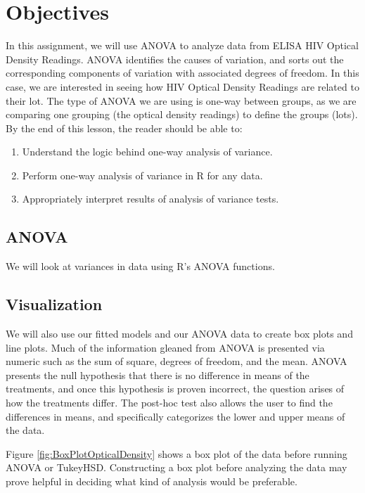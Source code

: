 \section{Objectives}

In this assignment, we will use ANOVA to analyze data from ELISA HIV Optical Density Readings.
ANOVA identifies the causes of variation, and sorts out the corresponding components of variation with associated degrees of freedom. 
In this case, we are interested in seeing how HIV Optical Density Readings are related to their lot. 
The type of ANOVA we are using is one-way between groups, as we are comparing one grouping (the optical density readings) to define the groups (lots). 
\singlespacing
By the end of this lesson, the reader should be able to:
\begin{enumerate}
        \item Understand the logic behind one-way analysis of variance.
        \item Perform one-way analysis of variance in R for any data. 
        \item Appropriately interpret results of analysis of variance tests.
\end{enumerate}

\subsection{ANOVA}

We will look at variances in data using R's ANOVA functions.

\subsection{Visualization}

We will also use our fitted models and our ANOVA data to create box plots and line plots.
Much of the information gleaned from ANOVA is presented via numeric such as the sum of square, degrees of freedom, and the mean.
ANOVA presents the null hypothesis that there is no difference in means of the treatments, and once this hypothesis is proven incorrect, the question arises of how the treatments differ.
The post-hoc test also allows the user to find the differences in means, and specifically categorizes the lower and upper means of the data.

Figure \ref{fig:BoxPlotOpticalDensity} shows a box plot of the data before running ANOVA or TukeyHSD.
Constructing a box plot before analyzing the data may prove helpful in deciding what kind of analysis would be preferable.

